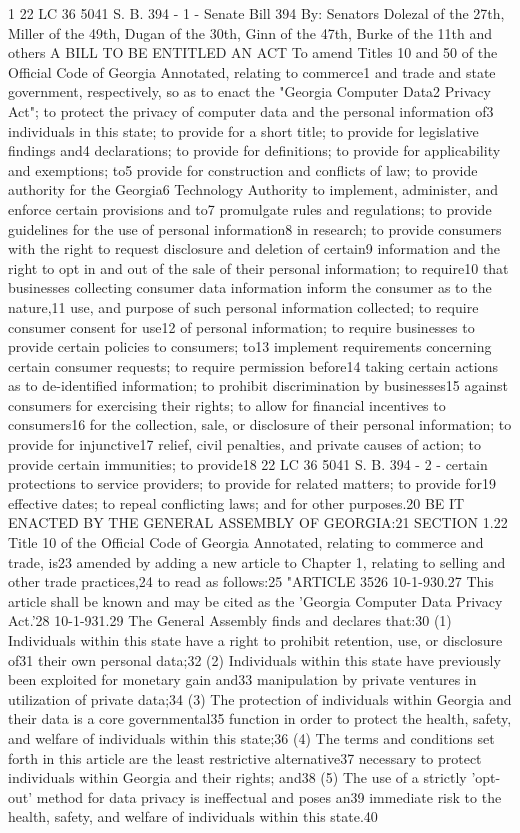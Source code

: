 
1
22 LC 36 5041
S. B. 394
- 1 -
Senate Bill 394
By: Senators Dolezal of the 27th, Miller of the 49th, Dugan of the 30th, Ginn of the 47th,
Burke of the 11th and others
A BILL TO BE ENTITLED
AN ACT
To amend Titles 10 and 50 of the Official Code of Georgia Annotated, relating to commerce1
and trade and state government, respectively, so as to enact the "Georgia Computer Data2
Privacy Act"; to protect the privacy of computer data and the personal information of3
individuals in this state; to provide for a short title; to provide for legislative findings and4
declarations; to provide for definitions; to provide for applicability and exemptions; to5
provide for construction and conflicts of law; to provide authority for the Georgia6
Technology Authority to implement, administer, and enforce certain provisions and to7
promulgate rules and regulations; to provide guidelines for the use of personal information8
in research; to provide consumers with the right to request disclosure and deletion of certain9
information and the right to opt in and out of the sale of their personal information; to require10
that businesses collecting consumer data information inform the consumer as to the nature,11
use, and purpose of such personal information collected; to require consumer consent for use12
of personal information; to require businesses to provide certain policies to consumers; to13
implement requirements concerning certain consumer requests; to require permission before14
taking certain actions as to de-identified information; to prohibit discrimination by businesses15
against consumers for exercising their rights; to allow for financial incentives to consumers16
for the collection, sale, or disclosure of their personal information; to provide for injunctive17
relief, civil penalties, and private causes of action; to provide certain immunities; to provide18
22 LC 36 5041
S. B. 394
- 2 -
certain protections to service providers; to provide for related matters; to provide for19
effective dates; to repeal conflicting laws; and for other purposes.20
BE IT ENACTED BY THE GENERAL ASSEMBLY OF GEORGIA:21
SECTION 1.22
Title 10 of the Official Code of Georgia Annotated, relating to commerce and trade, is23
amended by adding a new article to Chapter 1, relating to selling and other trade practices,24
to read as follows:25
"ARTICLE 3526
10-1-930.27
This article shall be known and may be cited as the 'Georgia Computer Data Privacy Act.'28
10-1-931.29
The General Assembly finds and declares that:30
(1) Individuals within this state have a right to prohibit retention, use, or disclosure of31
their own personal data;32
(2) Individuals within this state have previously been exploited for monetary gain and33
manipulation by private ventures in utilization of private data;34
(3) The protection of individuals within Georgia and their data is a core governmental35
function in order to protect the health, safety, and welfare of individuals within this state;36
(4) The terms and conditions set forth in this article are the least restrictive alternative37
necessary to protect individuals within Georgia and their rights; and38
(5) The use of a strictly 'opt-out' method for data privacy is ineffectual and poses an39
immediate risk to the health, safety, and welfare of individuals within this state.40
